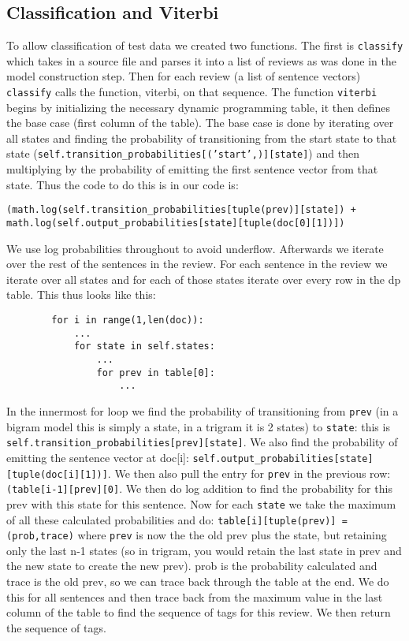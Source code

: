 \documentclass{article}
\begin{document}
\subsection{Classification and Viterbi}

To allow classification of test data we created two functions. The first is \texttt{classify} which takes in a source file and parses it into a list of reviews as was done in the model construction step. Then for each review (a list of sentence vectors) \texttt{classify} calls the function, viterbi, on that sequence. The function \texttt{viterbi} begins by initializing the necessary dynamic programming table, it then defines the base case (first column of the table). The base case is done by iterating over all states and finding the probability of transitioning from the start state to that state (\texttt{self.transition\_probabilities[('start',)][state]}) and then multiplying by the probability of emitting the first sentence vector from that state. Thus the code to do this is in our code is:
\begin{verbatim}
(math.log(self.transition_probabilities[tuple(prev)][state]) + math.log(self.output_probabilities[state][tuple(doc[0][1])])
\end{verbatim}

We use log probabilities throughout to avoid underflow. Afterwards we iterate over the rest of the sentences in the review. For each sentence in the review we iterate over all states and for each of those states iterate over every row in the dp table. This thus looks like this:
\begin{verbatim}
        for i in range(1,len(doc)):
            ...
            for state in self.states:
                ...
                for prev in table[0]:
                    ...
\end{verbatim}

In the innermost for loop we find the probability of transitioning from \texttt{prev} (in a bigram model this is simply a state, in a trigram it is 2 states) to \texttt{state}: this is \texttt{self.transition\_probabilities[prev][state]}. We also find the probability of emitting the sentence vector at doc[i]: \texttt{self.output\_probabilities[state][tuple(doc[i][1])]}. We then also pull the entry for \texttt{prev} in the previous row: \texttt{(table[i-1][prev][0]}. We then do log addition to find the probability for this prev with this state for this sentence. Now for each \texttt{state} we take the maximum of all these calculated probabilities and do: \texttt{table[i][tuple(prev)] = (prob,trace)} where \texttt{prev} is now the the old prev plus the state, but retaining only the last n-1 states (so in trigram, you would retain the last state in prev and the new state to create the new prev). prob is the probability calculated and trace is the old prev, so we can trace back through the table at the end. We do this for all sentences and then trace back from the maximum value in the last column of the table to find the sequence of tags for this review. We then return the sequence of tags. 
\end{document}
